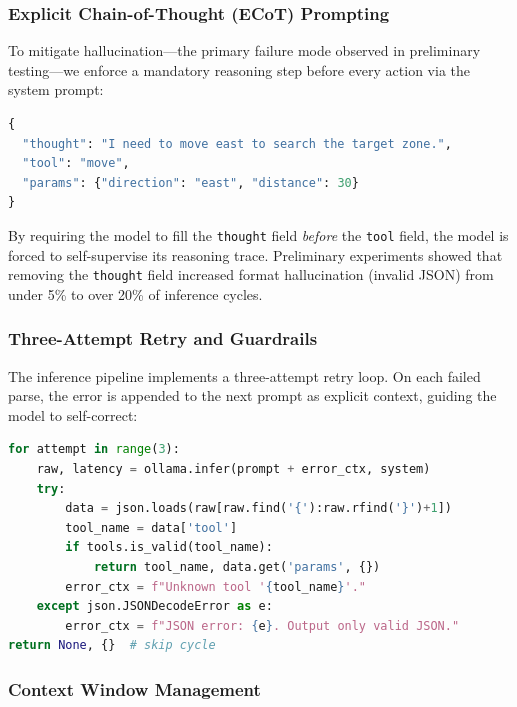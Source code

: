 \documentclass[conference]{IEEEtran}
\begin{document}
\subsubsection{Explicit Chain-of-Thought (ECoT) Prompting}

To mitigate hallucination—the primary failure mode observed in preliminary testing—we enforce a mandatory reasoning step before every action via the system prompt:

\begin{lstlisting}[language=Python, caption={JSON output schema enforced by system prompt.}]
{
  "thought": "I need to move east to search the target zone.",
  "tool": "move",
  "params": {"direction": "east", "distance": 30}
}
\end{lstlisting}

By requiring the model to fill the \texttt{thought} field \emph{before} the \texttt{tool} field, the model is forced to self-supervise its reasoning trace. Preliminary experiments showed that removing the \texttt{thought} field increased format hallucination (invalid JSON) from under 5\% to over 20\% of inference cycles.

\subsubsection{Three-Attempt Retry and Guardrails}

The inference pipeline implements a three-attempt retry loop. On each failed parse, the error is appended to the next prompt as explicit context, guiding the model to self-correct:

\begin{lstlisting}[language=Python, caption={Three-attempt retry with self-correction context.}]
for attempt in range(3):
    raw, latency = ollama.infer(prompt + error_ctx, system)
    try:
        data = json.loads(raw[raw.find('{'):raw.rfind('}')+1])
        tool_name = data['tool']
        if tools.is_valid(tool_name):
            return tool_name, data.get('params', {})
        error_ctx = f"Unknown tool '{tool_name}'."
    except json.JSONDecodeError as e:
        error_ctx = f"JSON error: {e}. Output only valid JSON."
return None, {}  # skip cycle
\end{lstlisting}

\subsubsection{Context Window Management}
\end{document}
